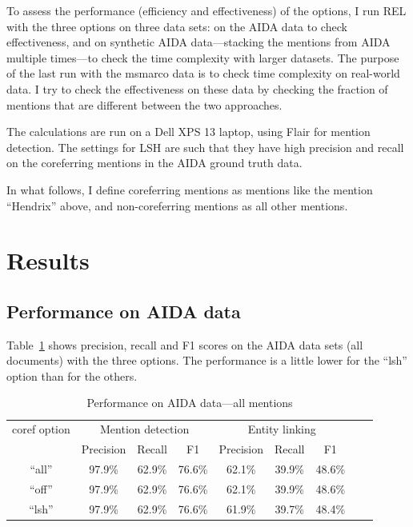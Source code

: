 \documentclass[a4paper,11pt]{article}
\numberwithin{equation}{section} %
\begin{document}
To assess the performance (efficiency and effectiveness) of the options, I run REL with the three options on three data sets: on the AIDA data to check effectiveness, and on synthetic AIDA data---stacking the mentions from AIDA multiple times---to check the time complexity with larger datasets. The purpose of the last run with the msmarco data is to check time complexity on real-world data. I try to check the effectiveness on these data by checking the fraction of mentions that are different between the two approaches. 

The calculations are run on a Dell XPS 13 laptop, using Flair for mention detection. The settings for LSH are such that they have high precision and recall on the coreferring mentions in the AIDA ground truth data. 

In what follows, I define coreferring mentions as mentions like the mention ``Hendrix'' above, and non-coreferring mentions as all other mentions.



\section{Results}

\subsection{Performance on AIDA data}

Table~\ref{tab:performance_aida_full} shows precision, recall and F1 scores on the AIDA data sets (all documents) with the three options. The performance is a little lower for the ``lsh'' option than for the others. 

\begin{table}
 \begin{tabular}{c c c c c c c c c}
\hline
 coref option & \multicolumn{3}{c}{Mention detection} & \multicolumn{3}{c}{Entity linking}  \\
        & Precision & Recall & F1 & Precision & Recall & F1 \\
 \hline 
 ``all'' & 97.9\% & 62.9\% & 76.6\% & 62.1\% & 39.9\% & 48.6\% \\  
 ``off'' & 97.9\% & 62.9\% & 76.6\%  & 62.1\% & 39.9\% & 48.6\% \\ 
 ``lsh'' & 97.9\% & 62.9\% & 76.6\%  & 61.9\% & 39.7\% & 48.4\% \\
\hline 
\end{tabular}
\caption{Performance on AIDA data---all mentions}
\label{tab:performance_aida_full}
\end{table}
\end{document}
